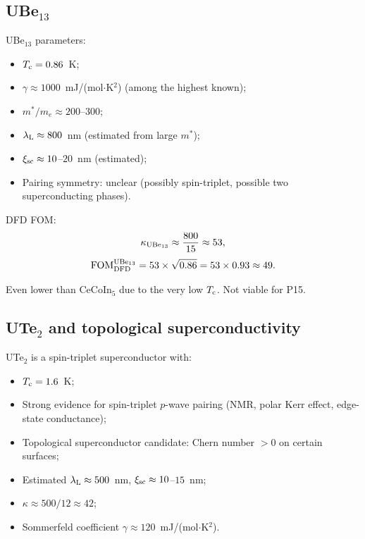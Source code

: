 \documentclass[11pt]{article}
\newcommand{\lambdaL}{\lambda_{\rm L}}
\newcommand{\xsc}{\xi_{\rm sc}}
\newcommand{\Tc}{T_{\rm c}}
\newcommand{\FOM}{\mathrm{FOM}}
\newcommand{\mstar}{m^*}
\begin{document}
\subsection{UBe$_{13}$}

UBe$_{13}$ parameters:
\begin{itemize}
\item $\Tc = 0.86$~K;
\item $\gamma \approx 1000$~mJ/(mol$\cdot$K$^2$) (among the highest known);
\item $\mstar/m_e \approx 200$--$300$;
\item $\lambdaL \approx 800$~nm (estimated from large $\mstar$);
\item $\xsc \approx 10$--$20$~nm (estimated);
\item Pairing symmetry: unclear (possibly spin-triplet, possible two
  superconducting phases).
\end{itemize}

DFD FOM:
\begin{equation}
\kappa_{\rm UBe_{13}} \approx \frac{800}{15} \approx 53,
\end{equation}
\begin{equation}
\FOM_{\rm DFD}^{\rm UBe_{13}}
= 53 \times \sqrt{0.86}
= 53 \times 0.93
\approx 49.
\label{eq:fom-ube13}
\end{equation}

Even lower than CeCoIn$_5$ due to the very low $\Tc$. Not viable for P15.

\subsection{UTe$_2$ and topological superconductivity}

UTe$_2$ is a spin-triplet superconductor with:
\begin{itemize}
\item $\Tc = 1.6$~K;
\item Strong evidence for spin-triplet $p$-wave pairing (NMR, polar Kerr
  effect, edge-state conductance);
\item Topological superconductor candidate: Chern number $> 0$ on certain
  surfaces;
\item Estimated $\lambdaL \approx 500$~nm, $\xsc \approx 10$--$15$~nm;
\item $\kappa \approx 500/12 \approx 42$;
\item Sommerfeld coefficient $\gamma \approx 120$~mJ/(mol$\cdot$K$^2$).
\end{itemize}
\end{document}
